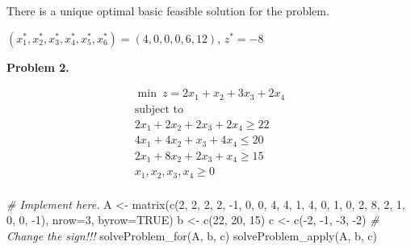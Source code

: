 \documentclass[
]{article}
\newenvironment{Shaded}{\begin{snugshade}}{\end{snugshade}}
\newcommand{\AttributeTok}[1]{\textcolor[rgb]{0.77,0.63,0.00}{#1}}
\newcommand{\CommentTok}[1]{\textcolor[rgb]{0.56,0.35,0.01}{\textit{#1}}}
\newcommand{\ConstantTok}[1]{\textcolor[rgb]{0.00,0.00,0.00}{#1}}
\newcommand{\DecValTok}[1]{\textcolor[rgb]{0.00,0.00,0.81}{#1}}
\newcommand{\FunctionTok}[1]{\textcolor[rgb]{0.00,0.00,0.00}{#1}}
\newcommand{\NormalTok}[1]{#1}
\newcommand{\OtherTok}[1]{\textcolor[rgb]{0.56,0.35,0.01}{#1}}
\newcommand{\SpecialCharTok}[1]{\textcolor[rgb]{0.00,0.00,0.00}{#1}}
\begin{document}
There is a unique optimal basic feasible solution for the problem.

\((x^*_1, x^*_2, x^*_3, x^*_4, x^*_5, x^*_6)=(4, 0, 0, 0, 6, 12)\),
\(z^*=-8\)

\textbf{Problem 2.}

\vspace{-0.5cm}

\begin{eqnarray*}
\min\ z=2x_{1}+x_{2}+3x_3+2x_4\\
\mbox{subject to}\hspace{3cm}\\
2x_{1}+2x_{2}+2x_3+2x_4\geq 22\\
4x_{1}+4x_{2}+x_3+4x_4\leq 20\\
2x_{1}+8x_{2}+2x_3+x_4\geq 15 \\
x_{1},x_{2},x_{3},x_4\geq 0\\
\end{eqnarray*}

\vspace{-0.5cm}

\begin{Shaded}
\begin{Highlighting}[]
\CommentTok{\# Implement here.}
\NormalTok{A }\OtherTok{\textless{}{-}} \FunctionTok{matrix}\NormalTok{(}\FunctionTok{c}\NormalTok{(}\DecValTok{2}\NormalTok{, }\DecValTok{2}\NormalTok{, }\DecValTok{2}\NormalTok{, }\DecValTok{2}\NormalTok{, }\SpecialCharTok{{-}}\DecValTok{1}\NormalTok{, }\DecValTok{0}\NormalTok{, }\DecValTok{0}\NormalTok{, }\DecValTok{4}\NormalTok{, }\DecValTok{4}\NormalTok{, }\DecValTok{1}\NormalTok{, }\DecValTok{4}\NormalTok{, }\DecValTok{0}\NormalTok{, }\DecValTok{1}\NormalTok{, }\DecValTok{0}\NormalTok{, }\DecValTok{2}\NormalTok{, }\DecValTok{8}\NormalTok{, }\DecValTok{2}\NormalTok{, }\DecValTok{1}\NormalTok{, }\DecValTok{0}\NormalTok{, }\DecValTok{0}\NormalTok{, }\SpecialCharTok{{-}}\DecValTok{1}\NormalTok{), }\AttributeTok{nrow=}\DecValTok{3}\NormalTok{, }\AttributeTok{byrow=}\ConstantTok{TRUE}\NormalTok{)}
\NormalTok{b }\OtherTok{\textless{}{-}} \FunctionTok{c}\NormalTok{(}\DecValTok{22}\NormalTok{, }\DecValTok{20}\NormalTok{, }\DecValTok{15}\NormalTok{)}
\NormalTok{c }\OtherTok{\textless{}{-}} \FunctionTok{c}\NormalTok{(}\SpecialCharTok{{-}}\DecValTok{2}\NormalTok{, }\SpecialCharTok{{-}}\DecValTok{1}\NormalTok{, }\SpecialCharTok{{-}}\DecValTok{3}\NormalTok{, }\SpecialCharTok{{-}}\DecValTok{2}\NormalTok{)}
\CommentTok{\# Change the sign!!!}
\FunctionTok{solveProblem\_for}\NormalTok{(A, b, c)}
\FunctionTok{solveProblem\_apply}\NormalTok{(A, b, c)}
\end{Highlighting}
\end{Shaded}
\end{document}
